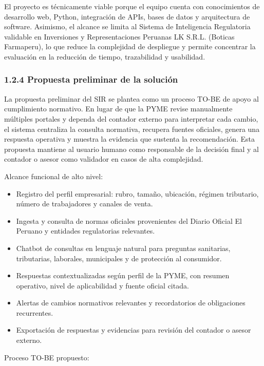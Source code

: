 \documentclass[12pt,a4paper,oneside]{report}
\begin{document}
El proyecto es técnicamente viable porque el equipo cuenta con
conocimientos de desarrollo web, Python, integración de APIs, bases de
datos y arquitectura de software. Asimismo, el alcance se limita al
Sistema de Inteligencia Regulatoria validable en Inversiones y
Representaciones Peruanas LK S.R.L. (Boticas Farmaperu), lo que reduce
la complejidad de despliegue y permite concentrar la evaluación en la
reducción de tiempo, trazabilidad y usabilidad.

\subsubsection{1.2.4 Propuesta preliminar de la
solución}\label{propuesta-preliminar-de-la-soluciuxf3n}

La propuesta preliminar del SIR se plantea como un proceso TO-BE de
apoyo al cumplimiento normativo. En lugar de que la PYME revise
manualmente múltiples portales y dependa del contador externo para
interpretar cada cambio, el sistema centraliza la consulta normativa,
recupera fuentes oficiales, genera una respuesta operativa y muestra la
evidencia que sustenta la recomendación. Esta propuesta mantiene al
usuario humano como responsable de la decisión final y al contador o
asesor como validador en casos de alta complejidad.

Alcance funcional de alto nivel:

\begin{itemize}
\item
  Registro del perfil empresarial: rubro, tamaño, ubicación, régimen
  tributario, número de trabajadores y canales de venta.
\item
  Ingesta y consulta de normas oficiales provenientes del Diario Oficial
  El Peruano y entidades regulatorias relevantes.
\item
  Chatbot de consultas en lenguaje natural para preguntas sanitarias,
  tributarias, laborales, municipales y de protección al consumidor.
\item
  Respuestas contextualizadas según perfil de la PYME, con resumen
  operativo, nivel de aplicabilidad y fuente oficial citada.
\item
  Alertas de cambios normativos relevantes y recordatorios de
  obligaciones recurrentes.
\item
  Exportación de respuestas y evidencias para revisión del contador o
  asesor externo.
\end{itemize}

Proceso TO-BE propuesto:
\end{document}
